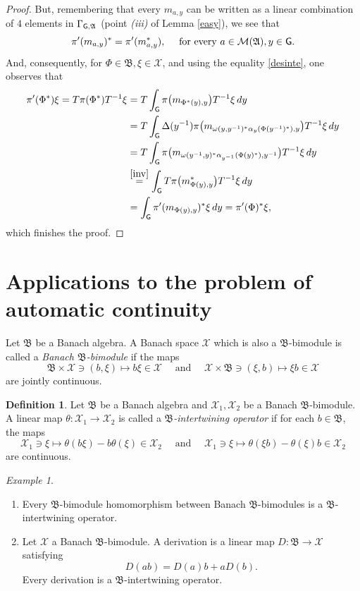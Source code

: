 \documentclass[11pt]{article}
\newcommand{\A}{\mathfrak{A}}
\newcommand{\B}{\mathfrak{B}}
\def\X{\mathcal{X}}
\def\d{{\rm d}}
\def\G{{\sf G}}
\theoremstyle{definition}
\newtheorem{defn}[thm]{Definition}
\theoremstyle{remark}
\newtheorem{ex}[thm]{Example}
\numberwithin{equation}{section}
\numberwithin{equation}{section}
\begin{document}
\begin{proof}
But, remembering that every $m_{a,y}$ can be written as a linear combination of $4$ elements in $\Gamma_{\G,\A}$ (point \emph{(iii)} of Lemma \ref{easy}), we see that
$$
\pi'(m_{a,y})^*=\pi'(m^*_{a,y}),\quad\text{ for every }a\in\mathcal{M}(\A),y\in \G.
$$
And, consequently, for $\Phi\in \B,\xi\in\X$, and using the equality \eqref{desinte}, one observes that
\begin{align*}
    \pi'(\Phi^*)\xi=T\pi(\Phi^*)T^{-1}\xi&=T\int_\G \pi\big( m_{\Phi^*(y),y}\big)T^{-1}\xi\,\d y \\
    &= T\int_\G \Delta(y^{-1})\pi\big(m_{\omega(y,y^{-1})^*\alpha_y(\Phi(y^{-1})^*),y}\big)T^{-1}\xi\,\d y \\
    &=T\int_\G \pi\big(m_{\omega(y^{-1},y)^*\alpha_{y^{-1}}(\Phi(y)^*),y^{-1}}\big)T^{-1}\xi\,\d y \\
    &\overset{\eqref{inv}}{=}\int_\G T\pi\big(m_{\Phi(y),y}^*\big)T^{-1}\xi\,\d y \\
    &=\int_\G \pi'(m_{\Phi(y),y})^*\xi\,\d y=\pi'(\Phi)^*\xi,
\end{align*}
 which finishes the proof.
\end{proof}



\section{Applications to the problem of automatic continuity}\label{mainsec}


Let $\B$ be a Banach algebra. A Banach space $\mathcal X$ which is also a $\B$-bimodule is called a \emph{Banach $\B$-bimodule} if the maps $$\B\times \mathcal X\ni(b,\xi)\mapsto b\xi \in\mathcal X \quad\text{ and }\quad \X\times\B\ni(\xi,b)\mapsto \xi b \in\mathcal X$$ are jointly continuous. 

\begin{defn}
    Let $\B$ be a Banach algebra and $\X_1,\X_2$ be a Banach $\B$-bimodule. A linear map $\theta:\X_1\to\X_2$ is called a \emph{$\B$-intertwining operator} if for each $b\in\B$, the maps $$\X_1\ni \xi\mapsto \theta(b\xi)-b\theta(\xi)\in \X_2\quad\text{ and }\quad \X_1\ni \xi\mapsto \theta(\xi b)-\theta(\xi)b\in \X_2$$ are continuous.
\end{defn}


\begin{ex}\label{ex-inter}\begin{enumerate}
        \item[(i)] Every $\B$-bimodule homomorphism between Banach $\B$-bimodules is a $\B$-intertwining operator.
        \item[(ii)] Let $\X$ a Banach $\B$-bimodule. A derivation is a linear map $D:\B\to \X$ satisfying $$D(ab)=D(a)b+aD(b).$$ Every derivation is a $\B$-intertwining operator. 
    \end{enumerate}
\end{ex}
\end{document}
